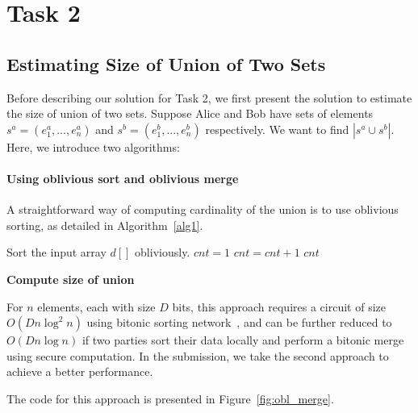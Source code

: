 \section{Task 2}
\subsection{Estimating Size of Union of Two Sets}
Before describing our solution for Task 2, we first present the solution to estimate the size of union of two sets.
Suppose Alice and Bob have sets of elements $s^a = (e^a_1,...,e^a_n)$
and $s^b = (e^b_1,...,e^b_n)$ respectively. We want to find $|s^a\cup s^b|$. Here, we introduce two algorithms:

\paragraph{Using oblivious sort and oblivious merge}
A straightforward way of computing cardinality of the union is to use oblivious sorting, as detailed in Algorithm~\ref{alg1}.

\begin{algorithm}
\begin{algorithmic}[1]
\State Sort the input array $d[]$ obliviously.
\State $cnt = 1$
		\State $cnt = cnt + 1$
	\EndIf
\EndFor
\State\Return $cnt$
\end{algorithmic}
\caption{\textbf{Compute size of union}} %
\label{alg1}
\end{algorithm}
For $n$ elements, each with size $D$ bits, this approach requires a circuit of size $O(Dn\log^2n)$ using bitonic sorting network~\cite{bitonicsort},
and can be further reduced to $O(Dn\log n)$ if two parties sort their data locally and perform a bitonic merge using secure computation.
In the submission, we take the second approach to achieve a better performance.

The code for this approach is presented in Figure~\ref{fig:obl_merge}.

